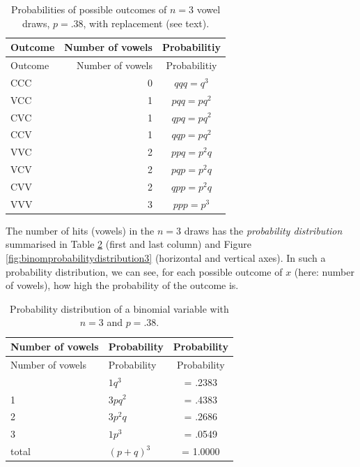 \documentclass[
]{book}
\begin{document}
\begin{longtable}[]{@{}lrc@{}}
\caption{\label{tab:vowelprobabilities} Probabilities of possible outcomes of \(n=3\)
vowel draws, \(p=.38\), with replacement (see text).}\tabularnewline
\toprule\noalign{}
Outcome & Number of vowels & Probabilitiy \\
\midrule\noalign{}
\endfirsthead
\toprule\noalign{}
Outcome & Number of vowels & Probabilitiy \\
\midrule\noalign{}
\endhead
\bottomrule\noalign{}
\endlastfoot
CCC & 0 & \(qqq = q^3\) \\
VCC & 1 & \(pqq = pq^2\) \\
CVC & 1 & \(qpq = pq^2\) \\
CCV & 1 & \(qqp = pq^2\) \\
VVC & 2 & \(ppq = p^2q\) \\
VCV & 2 & \(pqp = p^2q\) \\
CVV & 2 & \(qpp = p^2q\) \\
VVV & 3 & \(ppp = p^3\) \\
\end{longtable}

The number of hits (vowels) in the \(n=3\) draws has the
\emph{probability distribution} summarised in
Table \ref{tab:binomprobabilitydistribution3} (first and last column) and
Figure \ref{fig:binomprobabilitydistribution3} (horizontal and vertical axes).
In such a probability distribution, we can see, for each possible outcome of \(x\)
(here: number of vowels), how high the probability of the outcome is.

\begin{longtable}[]{@{}llc@{}}
\caption{\label{tab:binomprobabilitydistribution3} Probability distribution of a
binomial variable with \(n=3\) and \(p=.38\).}\tabularnewline
\toprule\noalign{}
Number of vowels & Probability & Probability \\
\midrule\noalign{}
\endfirsthead
\toprule\noalign{}
Number of vowels & Probability & Probability \\
\midrule\noalign{}
\endhead
\bottomrule\noalign{}
\endlastfoot
0 & \(1 q^3\) & = .2383 \\
1 & \(3 p q^2\) & = .4383 \\
2 & \(3 p^2 q\) & = .2686 \\
3 & \(1 p^3\) & = .0549 \\
total & \((p+q)^3\) & = 1.0000 \\
\end{longtable}
\end{document}
